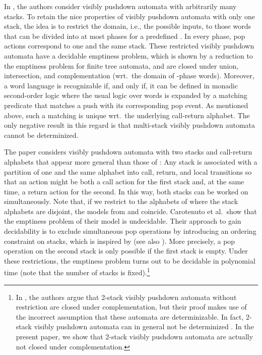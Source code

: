\documentclass{LMCS}
\begin{document}
In \cite{Madhusudan2007}, the authors consider visibly pushdown automata with
arbitrarily many stacks. To retain the nice properties of visibly pushdown
automata with only one stack, the idea is to restrict the domain, i.e., the
possible inputs, to those words that can be divided into at most  phases
for a predefined . In every phase, pop actions correspond to one and the
same stack. These restricted visibly pushdown automata have a decidable
emptiness problem, which is shown by a reduction to the emptiness problem for
finite tree automata, and are closed under union, intersection, and
complementation (wrt.\ the domain of -phase words). Moreover, a word
language is recognizable if, and only if, it can be defined in monadic
second-order logic where the usual logic over words is expanded by a matching
predicate that matches a push with its corresponding pop event. As mentioned
above, such a matching is unique wrt.\ the underlying call-return alphabet.
The only negative result in this regard is that multi-stack visibly pushdown
automata cannot be determinized.

The paper \cite{Murano2007} considers visibly pushdown automata with two
stacks and call-return alphabets that appear more general than those of
\cite{Madhusudan2007}: Any stack is associated with a partition of one and the
same alphabet into call, return, and local transitions so that an action might
be both a call action for the first stack and, at the same time, a return
action for the second. In this way, both stacks can be worked on
simultaneously. Note that, if we restrict to the alphabets of
\cite{Madhusudan2007} where the stack alphabets are disjoint, the models from
\cite{Murano2007} and \cite{Madhusudan2007} coincide. Carotenuto et al.\ show
that the emptiness problem of their model is undecidable. Their approach to
gain decidability is to exclude simultaneous pop operations by introducing an
ordering constraint on stacks, which is inspired by \cite{multi96} (see also
\cite{ABH-dlt08}). More precisely, a pop operation on the second stack is only
possible if the first stack is empty. Under these restrictions, the emptiness
problem turns out to be decidable in polynomial time (note that the number of
stacks is fixed).\footnote{In \cite{Murano2007}, the authors argue that
  2-stack visibly pushdown automata without restriction are closed under
  complementation, but their proof makes use of the incorrect assumption that
  these automata are determinizable. In fact, \mbox{2-stack} visibly pushdown
  automata can in general not be determinized \cite{Madhusudan2007}. In the
  present paper, we show that 2-stack visibly pushdown automata are actually
  not closed under complementation.}
\end{document}
